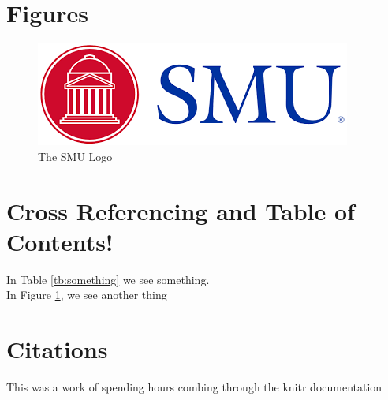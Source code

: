\documentclass[runningheads]{llncs}
\begin{document}
\section{Figures}
\begin{figure}[H]
	\label{fig:another}
	\begin{center}
		\includegraphics[scale=.2]{Images/Logo}
	\end{center}
\caption{The SMU Logo}
	\end{figure}
\section{Cross Referencing and Table of Contents!}
 In Table \ref{tb:something} we see something. \\ In Figure \ref{fig:another}, we see another thing
 \section{Citations}
 This was a work of spending hours combing through the knitr \cite{knitr} documentation \cite{Astro}
 
  
  
 

  
\end{document}
